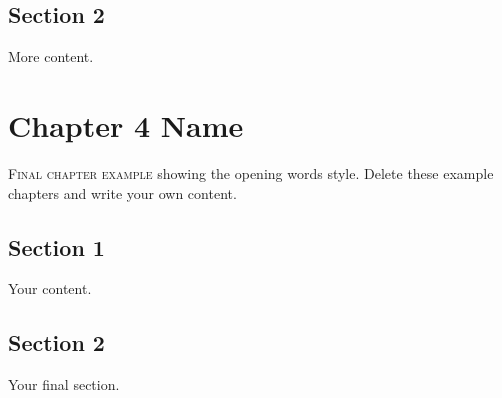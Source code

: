 \documentclass[a5paper,11pt]{book}
\newcommand{\openingwords}[1]{\noindent\textsc{#1}}
\begin{document}
\section{Section 2}
More content.

\chapter{Chapter 4 Name}

\openingwords{Final chapter example} showing the opening words style. Delete these example chapters and write your own content.

\section{Section 1}
Your content.

\section{Section 2}
Your final section.
\end{document}
